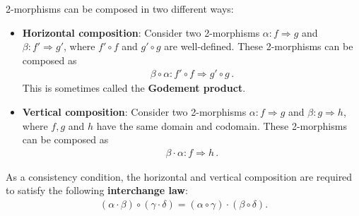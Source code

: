    \begin{property}
        2-morphisms can be composed in two different ways:
        \begin{itemize}
            \item\textbf{Horizontal composition}:
                Consider two 2-morphisms $\alpha:f\Rightarrow g$ and $\beta:f'\Rightarrow g'$, where $f'\circ f$ and $g'\circ g$ are well-defined. These 2-morphisms can be composed as
                \begin{gather}
                    \beta\circ\alpha: f'\circ f\Rightarrow g'\circ g\,.
                \end{gather}
                This is sometimes called the \textbf{Godement product}.
            \item\textbf{Vertical composition}:
                Consider two 2-morphisms $\alpha:f\Rightarrow g$ and $\beta:g\Rightarrow h$, where $f,g$ and $h$ have the same domain and codomain. These 2-morphisms can be composed as
                \begin{gather}
                    \beta\cdot\alpha:f\Rightarrow h\,.
                \end{gather}
        \end{itemize}
        As a consistency condition, the horizontal and vertical composition are required to satisfy the following \textbf{interchange law}:
        \begin{gather}
            (\alpha\cdot\beta)\circ(\gamma\cdot\delta) = (\alpha\circ\gamma)\cdot(\beta\circ\delta).
        \end{gather}
    \end{property}


